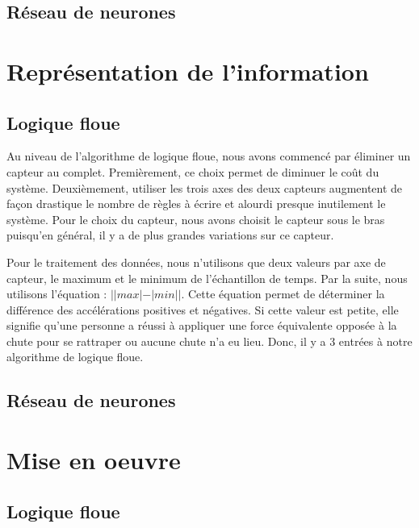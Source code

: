\documentclass[12pt,letterpaper]{article}
\begin{document}
\subsection{Réseau de neurones} %

\section{Représentation de l'information}

\subsection{Logique floue}

Au niveau de l'algorithme de logique floue, nous avons commencé par éliminer un capteur au complet. Premièrement, ce choix permet de diminuer le coût du système. Deuxièmement, utiliser les trois axes des deux capteurs augmentent de façon drastique le nombre de règles à écrire et alourdi presque inutilement le système. Pour le choix du capteur, nous avons choisit le capteur sous le bras puisqu'en général, il y a de plus grandes variations sur ce capteur.

Pour le traitement des données, nous n'utilisons que deux valeurs par axe de capteur, le maximum et le minimum de l'échantillon de temps. Par la suite, nous utilisons l'équation : $||max|-|min||$. Cette équation permet de déterminer la différence des accélérations positives et négatives. Si cette valeur est petite, elle signifie qu'une personne a réussi à appliquer une force équivalente opposée à la chute pour se rattraper ou aucune chute n'a eu lieu. Donc, il y a 3 entrées à notre algorithme de logique floue. 

\subsection{Réseau de neurones} %

\section{Mise en oeuvre}

\subsection{Logique floue}
\end{document}

